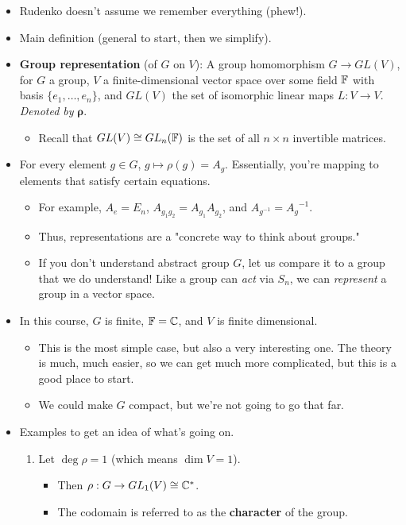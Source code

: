 \documentclass[../notes.tex]{subfiles}
\begin{document}
\begin{itemize}
    \item Rudenko doesn't assume we remember everything (phew!).
    \item Main definition (general to start, then we simplify).
    \item \textbf{Group representation} (of $G$ on $V$): A group homomorphism $G\to GL(V)$, for $G$ a group, $V$ a finite-dimensional vector space over some field $\mathbb{F}$ with basis $\{e_1,\dots,e_n\}$, and $GL(V)$ the set of isomorphic linear maps $L:V\to V$. \emph{Denoted by} $\bm{\rho}$.
    \begin{itemize}
        \item Recall that $GL(V)\cong GL_n(\mathbb{F})$ is the set of all $n\times n$ invertible matrices.
    \end{itemize}
    \item For every element $g\in G$, $g\mapsto\rho(g)=A_g$. Essentially, you're mapping to elements that satisfy certain equations.
    \begin{itemize}
        \item For example, $A_e=E_n$, $A_{g_1g_2}=A_{g_1}A_{g_2}$, and $A_{g^{-1}}={A_g}^{-1}$.
        \item Thus, representations are a "concrete way to think about groups."
        \item If you don't understand abstract group $G$, let us compare it to a group that we do understand! Like a group can \emph{act} via $S_n$, we can \emph{represent} a group in a vector space.
    \end{itemize}
    \item In this course, $G$ is finite, $\mathbb{F}=\mathbb{C}$, and $V$ is finite dimensional.
    \begin{itemize}
        \item This is the most simple case, but also a very interesting one. The theory is much, much easier, so we can get much more complicated, but this is a good place to start.
        \item We could make $G$ compact, but we're not going to go that far.
    \end{itemize}
    \item Examples to get an idea of what's going on.
    \begin{enumerate}
        \item Let $\deg\rho=1$ (which means $\dim V=1$).
        \begin{itemize}
            \item Then $\rho:G\to GL_1(V)\cong\mathbb{C}^*$.
            \item The codomain is referred to as the \textbf{character} of the group.

\end{itemize}
\end{enumerate}
\end{itemize}
\end{document}
